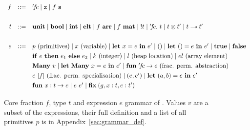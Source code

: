 \begin{figure}[p]
    \begin{center}
    \[\def\arraystretch{1.3}
    \begin{array}{rcl}
        f & ::= & {'\!f\!c}
                \mid \Zf
                \mid f\ \Sf \\
                \\
        t & ::= & \Unit
                \mid \Bool
                \mid \Int
                \mid \Elt
                \mid f\ \Arr
                \mid f\ \Mat
                \mid \Bang t
                \mid {'\!f\!c}.\ t
                \mid t \otimes t'
                \mid t \multimap t' \\
                \\
        e & ::= & p \textrm{ (primitives)}
                \mid x \textrm{ (variable)}
                \mid \Let\ x = e\ \In\ e'
                \mid ()
                \mid \Let\ () = e\ \In\ e'
                \mid \ottkw{true}
                \mid \ottkw{false}
                \\ && \ottkw{if}\ e\ \ottkw{then}\ e_1\ \ottkw{else}\ e_2
                \mid k \textrm{ (integer)}
                \mid l \textrm{ (heap location)}
                \mid el \textrm{ (array element)}
                \\ && \Many\ v
                \mid \Let\ \Many\ x = e\ \In\ e'
                \mid \ottkw{fun}\ '\!f\!c \rightarrow e
                    \textrm{ (frac. perm. abstraction)}
                \\ && e\ [f] \textrm{ (frac. perm. specialisation)}
                \mid (e, e')
                \mid \Let\ (a,b) = e\ \In\ e'
                \\ && \ottkw{fun}\ x : t \rightarrow e
                \mid e\ e'
                \mid \ottkw{fix} \: (g, x : t, e : t')
    \end{array} \]
    \end{center}
    \caption{Core fraction $f$, type $t$ and expression $e$ grammar of
        \lang. Values $v$ are a subset of the expressions, their full
        definition and a list of all primitives $p$ is in
        Appendix~\ref{sec:grammar_def}.}\label{fig:core_grammar}
\end{figure}

